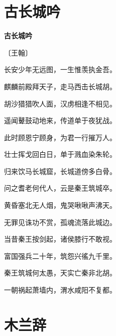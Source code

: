 \documentclass[12pt,UTF-8,openany,fontset=none]{ctexbook}
\begin{document}
\section{古长城吟}


\begin{center}
    {\bfseries 古长城吟}

    \vspace{18pt}

    \begin{large}\xuwen
        〔王翰〕
    \end{large}

\end{center}

    \vspace{18pt}  %

\begin{center}
    \begin{Large}

        长安少年无远图，一生惟羡执金吾。

        麒麟前殿拜天子，走马西击长城胡。

        胡沙猎猎吹人面，汉虏相逢不相见。

        遥闻鼙鼓动地来，传道单于夜犹战。

        此时顾恩宁顾身，为君一行摧万人。

        壮士挥戈回白日，单于溅血染朱轮。

        归来饮马长城窟，长城道傍多白骨。

        问之耆老何代人，云是秦王筑城卒。

        黄昏塞北无人烟，鬼哭啾啾声沸天。

        无罪见诛功不赏，孤魂流落此城边。

        当昔秦王按剑起，诸侯膝行不敢视。

        富国强兵二十年，筑怨兴徭九千里。

        秦王筑城何太愚，天实亡秦非北胡。

        一朝祸起萧墙内，渭水咸阳不复都。

    \end{Large}

\end{center}

\vspace{8pt}
\clearpage

\section{木兰辞}
\end{document}
